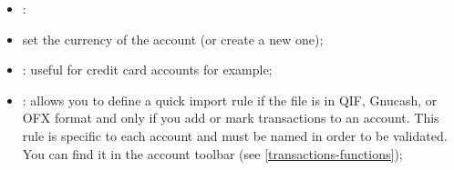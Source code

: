 \begin{enumerate}
\begin{itemize}
			\item {}:%
			\item set the currency of the account (or create a new one);
			\item {}: useful for credit card accounts for example;
			\item {}:%
			allows you to define a quick import rule if the file is in \gls{QIF}, \gls{Gnucash}, or \gls{OFX} format and only if you add or mark transactions to an account. This rule is specific to each account and must be named in order to be validated. You can find it in the account toolbar (see \vref{transactions-functions});

\end{itemize}
\end{enumerate}
